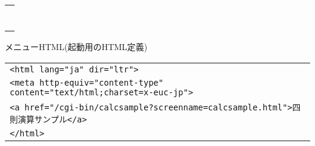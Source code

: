 {\begin{tabular}{|l|}
\vspace{-0.4em}\verb!!\\
\vspace{-0.4em}\verb!!\\
\vspace{-0.4em}\verb!!\\
\vspace{-0.4em}\verb!!\\
\vspace{-0.4em}\verb!!\\
\vspace{-0.4em}\verb!!\\
\\
\hline
\end{tabular}
}

{\gt メニューHTML(起動用のHTML定義)}

\begin{tabular}{|l|}
\hline
\verb+<html lang="ja" dir="ltr">+\\
\verb+<meta http-equiv="content-type" content="text/html;charset=x-euc-jp">+\\
\verb+<a href="/cgi-bin/calcsample?screenname=calcsample.html">四則演算サンプル</a>+\\
\verb+</html>+\\
\hline
\end{tabular}
